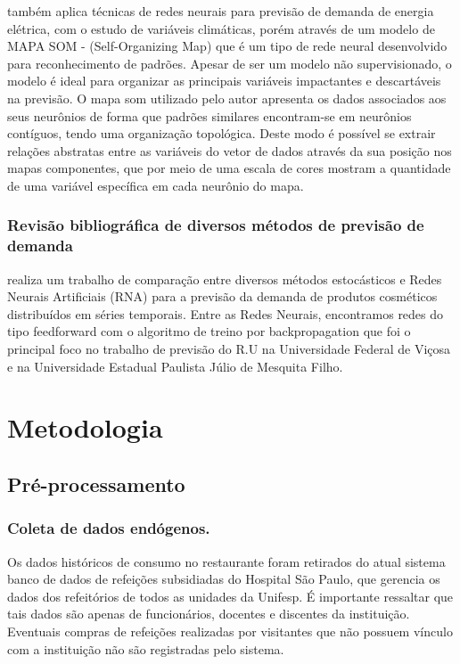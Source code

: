 \documentclass[	12pt, Times, openright, twoside, a4paper, english, brazil]{abntex2}
\begin{document}
       \cite{Silva2010} também aplica técnicas de redes neurais para previsão de demanda de energia elétrica, com o estudo de variáveis climáticas, porém através de um modelo de MAPA SOM - (Self-Organizing Map) que é um tipo de rede neural desenvolvido para reconhecimento de padrões. Apesar de ser um modelo não supervisionado, o modelo é ideal para organizar as principais variáveis impactantes e descartáveis na previsão. O mapa som utilizado pelo autor apresenta os dados associados aos seus neurônios de forma que padrões similares encontram-se em neurônios contíguos, tendo uma organização topológica. Deste modo é possível se extrair relações abstratas entre as variáveis do vetor de dados através da sua posição nos mapas componentes, que por meio de uma escala de cores mostram a quantidade de uma variável específica em cada neurônio do mapa.
       
       \subsection{Revisão bibliográfica de diversos métodos de previsão de demanda}
        \cite{Junior2007} realiza um trabalho de comparação entre diversos métodos estocásticos e  Redes Neurais Artificiais (RNA) para a previsão da demanda de produtos cosméticos distribuídos em séries temporais. Entre as Redes Neurais, encontramos redes do tipo feedforward com o algoritmo de treino por backpropagation que foi o principal foco no trabalho de previsão do R.U na Universidade Federal de Viçosa e na Universidade Estadual Paulista Júlio de Mesquita Filho.
  \chapter{Metodologia}
	\section{Pré-processamento}
	    \subsection{Coleta de dados endógenos.}
        	Os dados históricos de consumo no restaurante foram retirados do atual sistema banco de dados de refeições subsidiadas do Hospital São Paulo, que gerencia os dados dos refeitórios de todos as unidades da Unifesp. É importante ressaltar que tais dados são apenas de funcionários, docentes e discentes da instituição. Eventuais compras de refeições realizadas por visitantes que não possuem vínculo com a instituição não são registradas pelo sistema. 
        	
\end{document}
